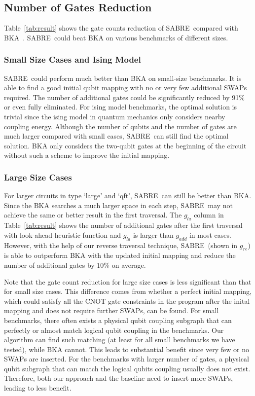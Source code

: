 \documentclass[journal,10pt,twocolumn]{IEEEtran}
\newcommand{\myalgorithmname}{SABRE}
\begin{document}
\subsection{Number of Gates Reduction}
Table~\ref{tab:result} shows the gate counts reduction of \myalgorithmname~compared with BKA~\cite{zulehner2018efficient}.
\myalgorithmname~could beat BKA on various benchmarks of different sizes.

\subsubsection{Small Size Cases and Ising Model} \myalgorithmname~could perform much better than BKA on small-size benchmarks.
It is able to find a good initial qubit mapping with no or very few additional SWAPs required. 
The number of additional gates could be significantly reduced by 91\% or even fully eliminated. %
For ising model benchmarks, the optimal solution is trivial since the ising model in quantum mechanics only considers nearby coupling energy. 
Although the number of qubits and the number of gates are much larger compared with small cases, \myalgorithmname~can still find the optimal solution. 
BKA only considers the two-qubit gates at the beginning of the circuit without such a scheme to improve the initial mapping. 

\subsubsection{Large Size Cases} For larger circuits in type `large' and `qft', \myalgorithmname~can still be better than BKA. 
Since the BKA searches a much larger space in each step, \myalgorithmname~may not achieve the same or better result in the first traversal.
The $g_{la}$ column in Table~\ref{tab:result} shows the number of additional gates after the first traversal with look-ahead heuristic function and $g_{la}$ is larger than $g_{add}$ in most cases. 
However, with the help of our reverse traversal technique, \myalgorithmname~(shown in $g_{re}$) is able to outperform BKA with the updated initial mapping and reduce the number of additional gates by $10\%$ on average. 

Note that the gate count reduction for large size cases is less significant than that for small size cases. 
This difference comes from whether a perfect initial mapping, which could satisfy all the CNOT gate constraints in the program after the inital mapping and does not require further SWAPs, can be found.
For small benchmarks, there often exists a physical qubit coupling subgraph that can perfectly or almost match logical qubit coupling in the benchmarks. 
Our algorithm can find such matching (at least for all small benchmarks we have tested), while BKA cannot. This leads to substantial benefit since very few or no SWAPs are inserted. 
For the benchmarks with larger number of gates, a physical qubit subgraph that can match the logical qubits coupling usually does not exist. Therefore, both our approach and the baseline need to insert more SWAPs, leading to less benefit.
\end{document}
